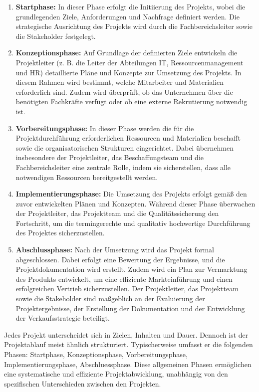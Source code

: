 \begin{enumerate}
	\item \textbf{Startphase:} 
	In dieser Phase erfolgt die Initiierung des Projekts, wobei die grundlegenden Ziele, Anforderungen und Nachfrage definiert werden. Die strategische Ausrichtung des Projekts wird durch die Fachbereichsleiter sowie die Stakeholder festgelegt.
	\item \textbf{Konzeptionsphase:}
	Auf Grundlage der definierten Ziele entwickeln die Projektleiter (z. B. die Leiter der Abteilungen IT, Ressourcenmanagement und HR) detaillierte Pläne und Konzepte zur Umsetzung des Projekts. In diesem Rahmen wird bestimmt, welche Mitarbeiter und Materialien erforderlich sind. Zudem wird überprüft, ob das Unternehmen über die benötigten Fachkräfte verfügt oder ob eine externe Rekrutierung notwendig ist.
	\item \textbf{Vorbereitungsphase:} 
	In dieser Phase werden die für die Projektdurchführung erforderlichen Ressourcen und Materialien beschafft sowie die organisatorischen Strukturen eingerichtet. Dabei übernehmen insbesondere der Projektleiter, das Beschaffungsteam und die Fachbereichsleiter eine zentrale Rolle, indem sie sicherstellen, dass alle notwendigen Ressourcen bereitgestellt werden.
	\item \textbf{Implementierungsphase:}  
	Die Umsetzung des Projekts erfolgt gemäß den zuvor entwickelten Plänen und Konzepten. Während dieser Phase überwachen der Projektleiter, das Projektteam und die Qualitätssicherung den Fortschritt, um die termingerechte und qualitativ hochwertige Durchführung des Projektes sicherzustellen.
	\item \textbf{Abschlussphase:} 
	Nach der Umsetzung wird das Projekt formal abgeschlossen. Dabei erfolgt eine Bewertung der Ergebnisse, und die Projektdokumentation wird erstellt. Zudem wird ein Plan zur Vermarktung des Produkts entwickelt, um eine effiziente Markteinführung und einen erfolgreichen Vertrieb sicherzustellen. Der Projektleiter, das Projektteam sowie die Stakeholder sind maßgeblich an der Evaluierung der Projektergebnisse, der Erstellung der Dokumentation und der Entwicklung der Verkaufsstrategie beteiligt.
\end{enumerate}
Jedes Projekt unterscheidet sich in Zielen, Inhalten und Dauer. Dennoch ist der Projektablauf meist ähnlich strukturiert. Typischerweise umfasst er die folgenden Phasen: Startphase, Konzeptionsphase, Vorbereitungsphase, Implementierungsphase, Abschluessphase. Diese allgemeinen Phasen ermöglichen eine systematische und effiziente Projektabwicklung, unabhängig von den spezifischen Unterschieden zwischen den Projekten\cite{wegmann2006projektmanagement}.
